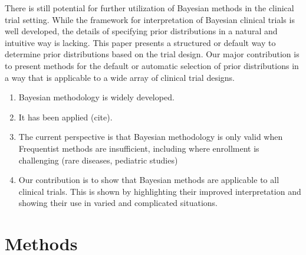 \documentclass[12pt]{article}
\begin{document}
There is still potential for further utilization of Bayesian methods in the clinical trial setting. While the framework for interpretation of Bayesian clinical trials is well developed, the details of specifying prior distributions in a natural and intuitive way is lacking. This paper presents a structured or default way to determine prior distributions based on the trial design. Our major contribution is to present methods for the default or automatic selection of prior distributions in a way that is applicable to a wide array of clinical trial designs.

\begin{enumerate}
\item Bayesian methodology is widely developed.
\item It has been applied (cite).
\item The current perspective is that Bayesian methodology is only valid when Frequentist methods are insufficient, including where enrollment is challenging (rare diseases, pediatric studies)
\item Our contribution is to show that Bayesian methods are applicable to all clinical trials. This is shown by highlighting their improved interpretation and showing their use in varied and complicated situations.
\end{enumerate}

\section{Methods}

\end{document}
